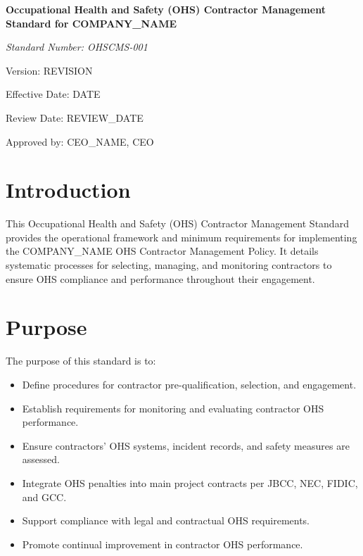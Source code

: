 \documentclass[12pt]{article}
\begin{document}
\begin{titlepage}
    \centering
    \vspace*{2cm}
    {\LARGE\bfseries Occupational Health and Safety (OHS) Contractor Management Standard for {{COMPANY_NAME}}\par}
    \vspace{1cm}
    {\large\itshape Standard Number: OHSCMS-001\par}
    \vspace{0.5cm}
    {\normalsize Version: {{REVISION}}\par}
    \vspace{0.5cm}
    {\normalsize Effective Date: {{DATE}}\par}
    \vspace{0.5cm}
    {\normalsize Review Date: {{REVIEW_DATE}}\par}
    \vspace{2cm}
    {\normalsize Approved by: {{CEO_NAME}}, CEO\par}
\end{titlepage}

\section{Introduction}
This Occupational Health and Safety (OHS) Contractor Management Standard provides the operational framework and minimum requirements for implementing the {{COMPANY_NAME}} OHS Contractor Management Policy. It details systematic processes for selecting, managing, and monitoring contractors to ensure OHS compliance and performance throughout their engagement.

\section{Purpose}
The purpose of this standard is to:
\begin{itemize}
    \item Define procedures for contractor pre-qualification, selection, and engagement.
    \item Establish requirements for monitoring and evaluating contractor OHS performance.
    \item Ensure contractors’ OHS systems, incident records, and safety measures are assessed.
    \item Integrate OHS penalties into main project contracts per JBCC, NEC, FIDIC, and GCC.
    \item Support compliance with legal and contractual OHS requirements.
    \item Promote continual improvement in contractor OHS performance.
\end{itemize}
\end{document}
